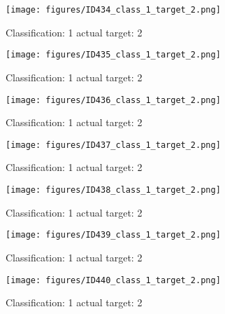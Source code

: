 \begin{figure}[h!]
\begin{center}
\texttt{[image: figures/ID434\_class\_1\_target\_2.png]}
\end{center}
\caption{ Classification: 1 actual target: 2}
\label{fig:ID434_class_1_target_2}
\end{figure}
\begin{figure}[h!]
\begin{center}
\texttt{[image: figures/ID435\_class\_1\_target\_2.png]}
\end{center}
\caption{ Classification: 1 actual target: 2}
\label{fig:ID435_class_1_target_2}
\end{figure}
\begin{figure}[h!]
\begin{center}
\texttt{[image: figures/ID436\_class\_1\_target\_2.png]}
\end{center}
\caption{ Classification: 1 actual target: 2}
\label{fig:ID436_class_1_target_2}
\end{figure}
\begin{figure}[h!]
\begin{center}
\texttt{[image: figures/ID437\_class\_1\_target\_2.png]}
\end{center}
\caption{ Classification: 1 actual target: 2}
\label{fig:ID437_class_1_target_2}
\end{figure}
\begin{figure}[h!]
\begin{center}
\texttt{[image: figures/ID438\_class\_1\_target\_2.png]}
\end{center}
\caption{ Classification: 1 actual target: 2}
\label{fig:ID438_class_1_target_2}
\end{figure}
\begin{figure}[h!]
\begin{center}
\texttt{[image: figures/ID439\_class\_1\_target\_2.png]}
\end{center}
\caption{ Classification: 1 actual target: 2}
\label{fig:ID439_class_1_target_2}
\end{figure}
\begin{figure}[h!]
\begin{center}
\texttt{[image: figures/ID440\_class\_1\_target\_2.png]}
\end{center}
\caption{ Classification: 1 actual target: 2}
\label{fig:ID440_class_1_target_2}
\end{figure}

